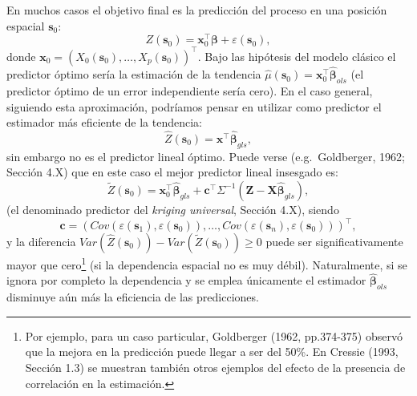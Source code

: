 \documentclass[
  spanish,
]{book}
\theoremstyle{break}
\theoremstyle{definition}
\theoremstyle{definition}
\theoremstyle{definition}
\theoremstyle{definition}
\theoremstyle{remark}
\begin{document}
En muchos casos el objetivo final es la predicción del proceso en una posición espacial \(\mathbf{s}_{0}\):
\[Z(\mathbf{s}_{0} )=\mathbf{x}_0^{\top}\boldsymbol{\beta}+\varepsilon (\mathbf{s}_{0} ),\]
donde \(\mathbf{x}_0=\left( X_{0} (\mathbf{s}_{0} ), \ldots,X_{p} (\mathbf{s}_{0})\right)^{\top}\).
Bajo las hipótesis del modelo clásico el predictor óptimo sería la estimación de la tendencia \(\hat{\mu}(\mathbf{s}_{0} ) = \mathbf{x}_0^{\top}\hat{\boldsymbol{\beta}}_{ols}\) (el predictor óptimo de un error independiente sería cero).
En el caso general, siguiendo esta aproximación, podríamos pensar en utilizar como predictor el estimador más eficiente de la tendencia:
\[\hat{Z} (\mathbf{s}_{0})=\mathbf{x^{\top}}\hat{\boldsymbol{\beta}}_{gls},\]
sin embargo no es el predictor lineal óptimo. Puede verse (e.g.~Goldberger, 1962; Sección 4.X) que en este caso el mejor predictor lineal insesgado es:
\begin{equation} 
  \tilde{Z}(\mathbf{s}_{0}) = \mathbf{x}_0^{\top}\hat{\boldsymbol{\beta}}_{gls} + \mathbf{c}^{\top} \Sigma^{-1} \left( \mathbf{Z} - \mathbf{X}\hat{\boldsymbol{\beta}}_{gls} \right),
  \label{eq:predictor-kriging}
\end{equation}
(el denominado predictor del \emph{kriging universal}, Sección 4.X), siendo
\[\mathbf{c} = \left( Cov\left( \varepsilon (\mathbf{s}_{1} ),\varepsilon (\mathbf{s}_{0} )\right), \ldots, Cov\left( \varepsilon (\mathbf{s}_{n} ),\varepsilon (\mathbf{s}_{0} )\right) \right)^{\top},\]
y la diferencia \(Var( \hat{Z} (\mathbf{s}_{0} ) ) - Var( \tilde{Z} (\mathbf{s}_{0} ) ) \ge 0\) puede ser significativamente mayor que cero\footnote{Por ejemplo, para un caso particular, Goldberger (1962, pp.374-375) observó que la mejora en la predicción puede llegar a ser del 50\%. En Cressie (1993, Sección 1.3) se muestran también otros ejemplos del efecto de la presencia de correlación en la estimación.} (si la dependencia espacial no es muy débil).
Naturalmente, si se ignora por completo la dependencia y se emplea únicamente el estimador \(\hat{\boldsymbol{\beta}}_{ols}\) disminuye aún más la eficiencia de las predicciones.
\end{document}
